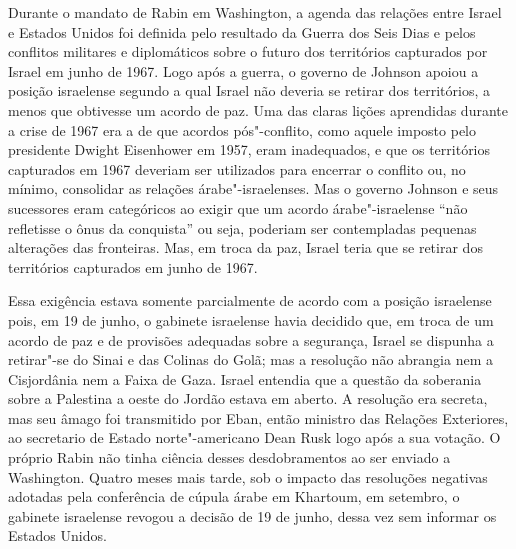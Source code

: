 Durante o mandato de Rabin em Washington, a agenda das relações entre
Israel e Estados Unidos foi definida pelo resultado da Guerra dos
Seis Dias e pelos conflitos militares e diplomáticos sobre o futuro dos
territórios capturados por Israel em junho de 1967. Logo após a guerra,
o governo de Johnson apoiou a posição israelense segundo a qual Israel
não deveria se retirar dos territórios, a menos que obtivesse um acordo
de paz. Uma das claras lições aprendidas durante a crise de 1967 era a
de que acordos pós"-conflito, como aquele imposto pelo presidente Dwight
Eisenhower em 1957, eram inadequados, e que os territórios capturados em
1967 deveriam ser utilizados para encerrar o conflito 
ou, no mínimo, consolidar as relações árabe"-israelenses. Mas o governo
Johnson e seus sucessores eram categóricos ao exigir que um acordo
árabe"-israelense ``não refletisse o ônus da conquista'' ou seja,
poderiam ser contempladas pequenas alterações das fronteiras. Mas, em
troca da paz, Israel teria que se retirar dos territórios capturados em
junho de 1967.

Essa exigência estava somente parcialmente de acordo com a posição
israelense pois, em 19 de junho, o gabinete israelense havia decidido
que, em troca de um acordo de paz e de provisões adequadas sobre a
segurança, Israel se dispunha a retirar"-se do Sinai e das Colinas do
Golã; mas a resolução não abrangia nem a Cisjordânia nem a Faixa de
Gaza. Israel entendia que a questão da soberania sobre a Palestina a
oeste do Jordão estava em aberto. A resolução era secreta, mas seu âmago
foi transmitido por Eban, então ministro das Relações Exteriores, ao secretario
de Estado norte"-americano Dean Rusk logo após a sua votação. O próprio
Rabin não tinha ciência desses desdobramentos ao ser enviado a
Washington. Quatro meses mais tarde, sob o impacto das resoluções
negativas adotadas pela conferência de cúpula árabe em Khartoum, em
setembro, o gabinete israelense revogou a decisão de 19 de junho, dessa
vez sem informar os Estados Unidos.


